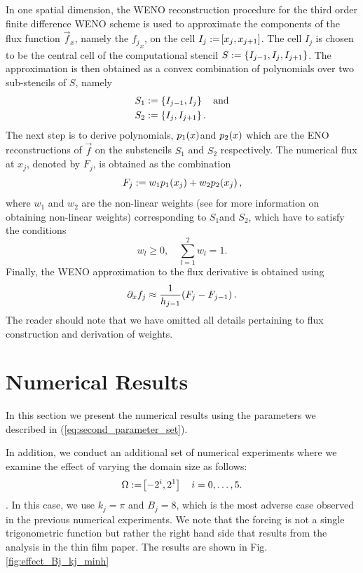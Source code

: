 \documentclass{amsart}
\theoremstyle{definition}
\theoremstyle{remark}
\numberwithin{equation}{section}
\begin{document}
In one spatial dimension, the WENO reconstruction procedure for the third order finite difference WENO scheme is used to approximate the components of the flux function $\vec{f}_x$, namely the $ {f_j}_x$, on the cell $I_j:=\!\left[{x_j, x_{j+1}}\right]$.  The cell $I_j$ is chosen to be the central cell of the computational stencil $S:=\left\lbrace I_{j-1}, I_j, I_{j+1}\right\rbrace$.  The approximation is then obtained as a convex combination of polynomials over two sub-stencils of $S$, namely 
\begin{equation}
\begin{aligned}
S_1&:=\left\lbrace I_{j-1}, I_j\right\rbrace\quad \text{and}\\
S_2&:=\left\lbrace I_{j}, I_{j+1}\right\rbrace.
\end{aligned}
\end{equation}
The next step is to derive polynomials, $p_1\!\left({x}\right)$and
$p_2\!\left({x}\right)$ which are the ENO reconstructions of $\vec f$
on the substencils $S_1$ and $S_2$
respectively.  The numerical flux at $x_{j}$, denoted by
$F_{j}$, is obtained as the combination
\begin{equation}\label{eq_f_WENO}
F_{j}:=w_1p_1\!\left({x_{j}}\right) +w_2p_2\!\left({x_{j}}\right),
\end{equation}
where $w_1$ and $w_2$ are the non-linear weights (see \cite{shu1998essentially} for more information on obtaining non-linear weights) corresponding to $S_1$and $S_2$, which have to satisfy the conditions
\begin{equation}
w_l\geq 0,\quad \sum_{l=1}^2 w_l = 1.
\end{equation}
Finally, the WENO approximation to the flux derivative is obtained using
\begin{equation}\label{eq_WENO_approx_flux_derivative}
\partial_x f_j\approx \frac{1}{h_{j-1}}\!\left({F_{j}- F_{j-1}}\right).
\end{equation}
The reader should note that we have omitted all details pertaining to flux construction and derivation of weights. 
\section{Numerical Results}
In this section we present the numerical results using the parameters we described in (\ref{eq:second_parameter_set}).  

In addition, we conduct an additional set of numerical experiments where we  examine the effect of varying the domain size as follows:
\begin{equation}
\Omega:=\!\left[{-2^{i}, 2^{1}}\right]\quad i=0,\dots,5.
\end{equation}.
In this case, we use $k_j=\pi$ and $B_j=8$, which is the most adverse case observed in the previous numerical experiments.
We note that the forcing is not a single trigonometric function but rather the right hand side that results from the analysis in the thin film paper. The results are shown in Fig. \ref{fig:effect_Bj_kj_minh}
\end{document}
